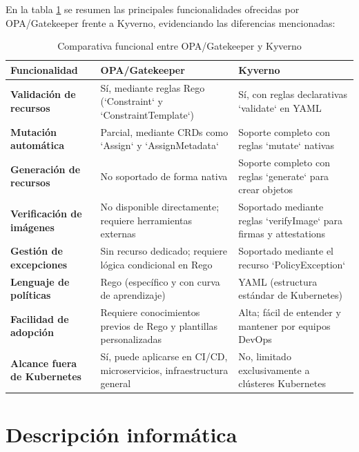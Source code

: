 \documentclass[12pt,twoside,titlepage]{report}
\newcommand\blankpage{%
    \newpage
    \null
    \thispagestyle{empty}%
    \newpage}
\begin{document}
En la tabla \ref{tab:kyverno-better} se resumen las principales funcionalidades ofrecidas por OPA/Gatekeeper frente a Kyverno, evidenciando las diferencias mencionadas:

\begin{table}[htbp]
\centering
\small
\caption{Comparativa funcional entre OPA/Gatekeeper y Kyverno}
\label{tab:kyverno-better}
\begin{tabular}{@{}p{4.2cm}p{5.3cm}p{5.3cm}@{}}
\toprule
\textbf{Funcionalidad} & \textbf{OPA/Gatekeeper} & \textbf{Kyverno} \\ \midrule
\textbf{Validación de recursos} & Sí, mediante reglas Rego (`Constraint` y `ConstraintTemplate`) & Sí, con reglas declarativas `validate` en YAML \\[0.2cm]
\textbf{Mutación automática} & Parcial, mediante CRDs como `Assign` y `AssignMetadata` & Soporte completo con reglas `mutate` nativas \\[0.2cm]
\textbf{Generación de recursos} & No soportado de forma nativa & Soporte completo con reglas `generate` para crear objetos \\[0.2cm]
\textbf{Verificación de imágenes} & No disponible directamente; requiere herramientas externas & Soportado mediante reglas `verifyImage` para firmas y attestations \\[0.2cm]
\textbf{Gestión de excepciones} & Sin recurso dedicado; requiere lógica condicional en Rego & Soportado mediante el recurso `PolicyException` \\[0.2cm]
\textbf{Lenguaje de políticas} & Rego (específico y con curva de aprendizaje) & YAML (estructura estándar de Kubernetes) \\[0.2cm]
\textbf{Facilidad de adopción} & Requiere conocimientos previos de Rego y plantillas personalizadas & Alta; fácil de entender y mantener por equipos DevOps \\[0.2cm]
\textbf{Alcance fuera de Kubernetes} & Sí, puede aplicarse en CI/CD, microservicios, infraestructura general & No, limitado exclusivamente a clústeres Kubernetes \\ \bottomrule
\end{tabular}
\end{table}








\chapter{Descripción informática}\label{chap:descinformatica}
\label{chap:contenidos}
\end{document}
